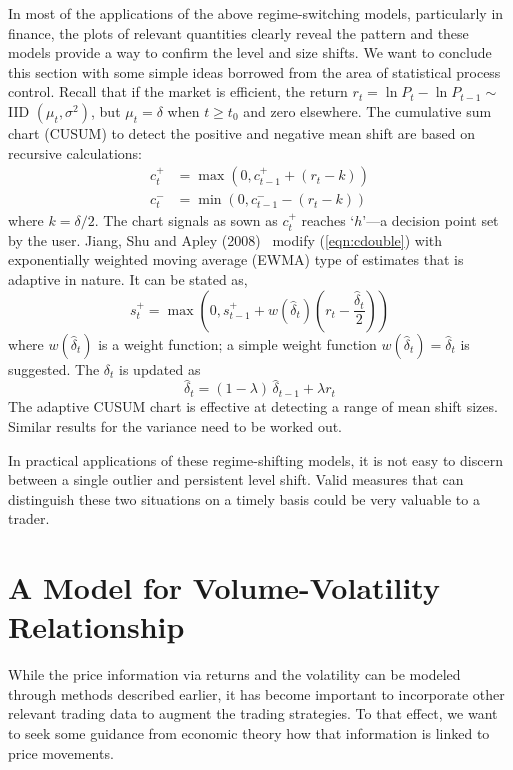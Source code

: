 In most of the applications of the above regime-switching models, particularly in finance, the plots of relevant quantities clearly reveal the pattern and these models provide a way to confirm the level and size shifts. We want to conclude this section with some simple ideas borrowed from the area of statistical process control. Recall that if the market is efficient, the return $r_t=\ln P_t - \ln P_{t-1}\sim $ IID $(\mu_t, \sigma^2)$, but $\mu_t=\delta$ when $t\geq t_0$ and zero elsewhere. The cumulative sum chart (CUSUM) to detect the positive and negative mean shift are based on recursive calculations:
	\begin{equation}\label{eqn:cdouble}
	\begin{split}
	c_t^+&=\max(0,c_{t-1}^+ + (r_t-k)) \\
	c_t^-&=\min(0,c_{t-1}^- - (r_t-k))
	\end{split}
	\end{equation}
where $k=\delta/2$. The chart signals as sown as $c_t^+$ reaches `$h$'---a decision point set by the user. Jiang, Shu and Apley (2008)~\cite{shuap} modify (\ref{eqn:cdouble}) with exponentially weighted moving average (EWMA) type of estimates that is adaptive in nature. It can be stated as,
	\begin{equation}\label{eqn:elma}
	s_t^+=\max\left(0,s_{t-1}^+ + w(\hat{\delta}_t)\left(r_t - \frac{\hat{\delta}_t}{2}\right)\right)
	\end{equation}
where $w(\hat{\delta}_t)$ is a weight function; a simple weight function $w(\hat{\delta}_t)=\hat{\delta}_t$ is suggested. The $\delta_t$ is updated as 
	\begin{equation}\label{eqn:updatedelt}
	\hat{\delta}_t=(1-\lambda)\, \hat{\delta}_{t-1} + \lambda r_t
	\end{equation}
The adaptive CUSUM chart is effective at detecting a range of mean shift sizes. Similar results for the variance need to be worked out.


In practical applications of these regime-shifting models, it is not easy to discern between a single outlier and persistent level shift. Valid measures that can distinguish these two situations on a timely basis could be very valuable to a trader. 


\section{A Model for Volume-Volatility Relationship}


While the price information via returns and the volatility can be modeled through methods described earlier, it has become important to incorporate other relevant trading data to augment the trading strategies. To that effect, we want to seek some guidance from economic theory how that information is linked to price movements.

